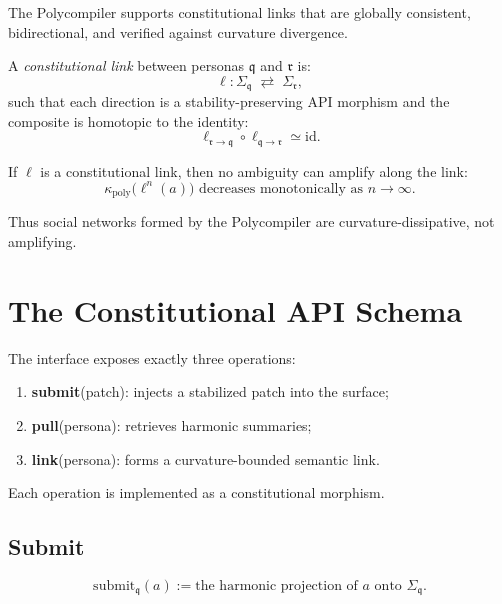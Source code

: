 The Polycompiler supports constitutional links that are 
globally consistent, bidirectional, and verified against curvature divergence.

\begin{definition}
A \emph{constitutional link} between personas $\mathfrak{q}$ and $\mathfrak{r}$ is:
\[
\ell : \Sigma_{\mathfrak{q}} \;\rightleftarrows\; \Sigma_{\mathfrak{r}},
\]
such that each direction is a stability-preserving API morphism and
the composite is homotopic to the identity:
\[
\ell_{\mathfrak{r}\to\mathfrak{q}}
\circ
\ell_{\mathfrak{q}\to\mathfrak{r}}
\simeq \mathrm{id}.
\]
\end{definition}

\begin{theorem}
If $\ell$ is a constitutional link, then no ambiguity can amplify along the link:
\[
\kappa_{\mathrm{poly}}\bigl(\ell^n(a)\bigr)
\text{ decreases monotonically as } n\to\infty.
\]
\end{theorem}

Thus social networks formed by the Polycompiler are curvature-dissipative,
not amplifying.


\section{The Constitutional API Schema}

The interface exposes exactly three operations:
\begin{enumerate}
    \item \textbf{submit}(patch): injects a stabilized patch into the surface;
    \item \textbf{pull}(persona): retrieves harmonic summaries;
    \item \textbf{link}(persona): forms a curvature-bounded semantic link.
\end{enumerate}

Each operation is implemented as a constitutional morphism.

\subsection{Submit}

\begin{definition}
\[
\mathrm{submit}_{\mathfrak{q}}(a)
:= 
\text{the harmonic projection of $a$ onto }\Sigma_{\mathfrak{q}}.
\]
\end{definition}


